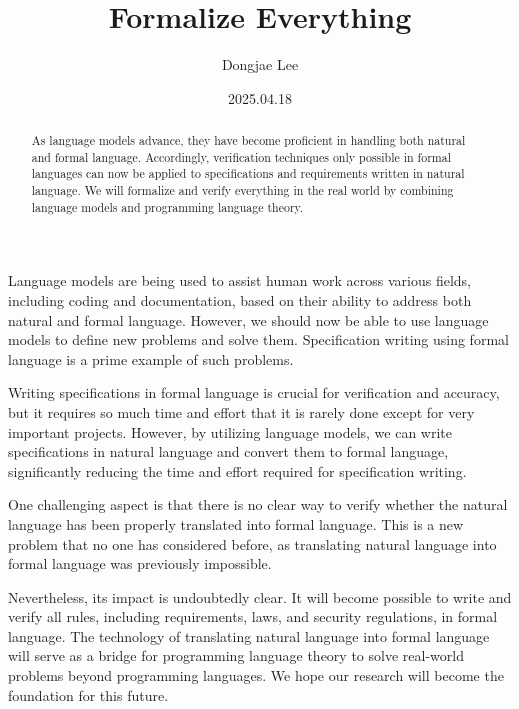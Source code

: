\documentclass[11pt, oneside]{article}
\title{Formalize Everything}
\author{Dongjae Lee}
\date{2025.04.18}
\begin{document}
\maketitle

\begin{abstract}
	As language models advance, they have become proficient in handling both natural and formal language.
	Accordingly, verification techniques only possible in formal languages can now be applied to specifications and requirements written in natural language.
	We will formalize and verify everything in the real world by combining language models and programming language theory.
\end{abstract}

Language models are being used to assist human work across various fields, including coding and documentation, based on their ability to address both natural and formal language.
However, we should now be able to use language models to define new problems and solve them. Specification writing using formal language is a prime example of such problems.

Writing specifications in formal language is crucial for verification and accuracy, but it requires so much time and effort that it is rarely done except for very important projects.
However, by utilizing language models, we can write specifications in natural language and convert them to formal language, significantly reducing the time and effort required for specification writing.

One challenging aspect is that there is no clear way to verify whether the natural language has been properly translated into formal language.
This is a new problem that no one has considered before, as translating natural language into formal language was previously impossible.

Nevertheless, its impact is undoubtedly clear. It will become possible to write and verify all rules, including requirements, laws, and security regulations, in formal language.
The technology of translating natural language into formal language will serve as a bridge for programming language theory to solve real-world problems beyond programming languages.
We hope our research will become the foundation for this future.
\end{document}
